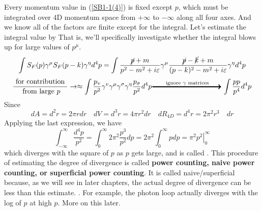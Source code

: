 Every momentum value in (\ref{SB1-1(4)}) is fixed except $p$, which must be integrated over 4D momentum space from $+\infty$ to $-\infty$ along all four axes. And we know all of the factors are finite except for the integral. Let's estimate the integral value by  That is, we'll specifically investigate whether the integral blows up for large values of $p^{\mu}$.
$$
\int S_{F}(p) \gamma^{\mu} S_{F}(p-k) \gamma^{\eta} d^{4} p=\int \frac{\cancel{p}+m}{p^{2}-m^{2}+i \varepsilon} \gamma^{\mu}\frac{\cancel{p}-\cancel{k}+m}{(p-k)^{2}-m^{2}+i \varepsilon} \gamma^{\eta} d^{4} p
$$
$$\frac{\text { for contribution }}{\text { from large } p}\rightarrow \approx\int \frac{p_{v}}{p^{2}} \gamma^{v} \gamma^{\mu} \gamma^{\sigma} \gamma^{\eta} \frac{p_{\sigma}}{p^{2}} d^{4} p\overset{\text{ignore }\gamma\text{ matrices}}{\Arrow{3.5cm}}\int \frac{p p}{p^{4}} d^{4} p
$$
Since
$$
d A=d^{2} r=2 \pi r d r\quad d V=d^{3} r=4 \pi r^{2} d r\quad d R_{4 D}=d^{4} r=2 \pi^{2} r^{3} \quad d r
$$
Applying the last expression, we have
$$
\int_{-\infty}^{\infty} \frac{d^{4} p}{p^{2}}=\int_{0}^{\infty} 2 \pi^{2} \frac{p^{3}}{p^{2}} d p=2 \pi^{2} \int_{0}^{\infty} p d p=\left.\pi^{2} p^{2}\right|_{0} ^{\infty}
$$
which diverges with the square of $p$ as $p$ gets large, and is called . This procedure of estimating the degree of divergence is called \textbf{power counting, naive power counting, or superficial power counting}. It is called naive/superficial because, as we will see in later chapters, the actual degree of divergence can be less than this estimate. . For example, the photon loop actually diverges with the log of $p$ at high $p$. More on this later.


